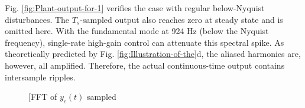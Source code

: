 \documentclass [11pt, proquest] {uwthesis}[2020/02/24]
\begin{document}
Fig. \ref{fig:Plant-output-for-1} verifies the case with regular
below-Nyquist disturbances. The $T_{s}$-sampled output also reaches
zero at steady state and is omitted here. With the fundamental mode
at 924 Hz (below the Nyquist frequency), single-rate high-gain control
can attenuate this spectral spike. As theoretically predicted by Fig.
\ref{fig:Illustration-of-the}d, the aliased harmonics are, however,
all amplified. Therefore, the actual continuous-time output contains
intersample ripples.
\begin{figure}[!ht]
\begin{centering}
\par\end{centering}
\begin{centering}
\subfloat[\label{fig:FFT-of-}FFT of $y_{c}(t)$ sampled

\end{centering}
\end{figure}
\end{document}
